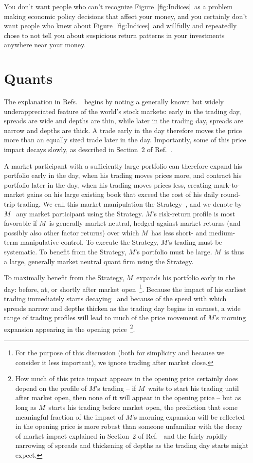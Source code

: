 \documentclass[twocolumn,twoside,prd,floatfix,letterpaper]{revtex4}
\def \FigMain {Figure~\ref{fig:Indices}}
\def \theExplanation {\cite{knuteson2016,knuteson2018,knuteson2019}}
\def \RefsTheExplanation {Refs.~\theExplanation}
\def \M {\ensuremath{M}}
\begin{document}
You don't want people who can't recognize \FigMain\ as a problem making economic policy decisions that affect your money, and you certainly don't want people who knew about \FigMain\ and willfully and repeatedly chose to not tell you about suspicious return patterns in your investments anywhere near your money.


\section{Quants}

The explanation in \RefsTheExplanation\ begins by noting a generally known but widely underappreciated feature of the world's stock markets: early in the trading day, spreads are wide and depths are thin, while later in the trading day, spreads are narrow and depths are thick.  A trade early in the day therefore moves the price more than an equally sized trade later in the day.  Importantly, some of this price impact decays slowly, as described in Section~2 of Ref.~\cite{knuteson2019}.

A market participant with a sufficiently large portfolio can therefore expand his portfolio early in the day, when his trading moves prices more, and contract his portfolio later in the day, when his trading moves prices less, creating mark-to-market gains on his large existing book that exceed the cost of his daily round-trip trading.  We call this market manipulation the Strategy~\cite{knuteson2018,knuteson2019}, and we denote by \M~\cite{knuteson2016} any market participant using the Strategy.  \M's risk-return profile is most favorable if \M\ is generally market neutral, hedged against market returns (and possibly also other factor returns) over which \M\ has less short- and medium-term manipulative control.  To execute the Strategy, \M's trading must be systematic.  To benefit from the Strategy, \M's portfolio must be large.  \M\ is thus a large, generally market neutral quant firm using the Strategy.

To maximally benefit from the Strategy, \M\ expands his portfolio early in the day:  before, at, or shortly after market open~\footnote{For the purpose of this discussion (both for simplicity and because we consider it less important), we ignore trading after market close.}.  Because the impact of his earliest trading immediately starts decaying~\cite{knuteson2019} and because of the speed with which spreads narrow and depths thicken as the trading day begins in earnest, a wide range of trading profiles will lead to much of the price movement of \M's morning expansion appearing in the opening price~\footnote{How much of this price impact appears in the opening price certainly does depend on the profile of \M's trading -- if \M\ waits to start his trading until after market open, then none of it will appear in the opening price -- but as long as \M\ starts his trading before market open, the prediction that some meaningful fraction of the impact of \M's morning expansion will be reflected in the opening price is more robust than someone unfamiliar with the decay of market impact explained in Section~2 of Ref.~\cite{knuteson2019} and the fairly rapidly narrowing of spreads and thickening of depths as the trading day starts might expect.}.
\end{document}

